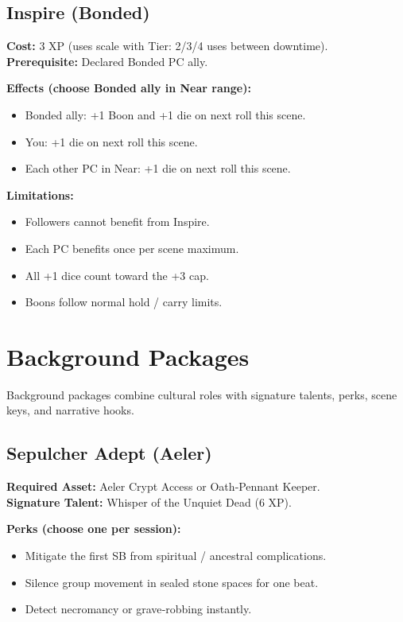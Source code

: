 \subsection{Inspire (Bonded)}\label{subsec:inspire_talent}

\textbf{Cost:} 3 XP (uses scale with Tier: 2/3/4 uses between downtime).\\
\textbf{Prerequisite:} Declared Bonded PC ally.

\textbf{Effects (choose Bonded ally in Near range):}
\begin{itemize}
    \item Bonded ally: +1 Boon and +1 die on next roll this scene.
    \item You: +1 die on next roll this scene.
    \item Each other PC in Near: +1 die on next roll this scene.
\end{itemize}

\textbf{Limitations:}
\begin{itemize}
    \item Followers cannot benefit from Inspire.
    \item Each PC benefits once per scene maximum.
    \item All +1 dice count toward the +3 cap.
    \item Boons follow normal hold / carry limits.
\end{itemize}

\section{Background Packages}\label{sec:background_packages}

Background packages combine cultural roles with signature talents, perks, scene keys, and narrative hooks.

\subsection{Sepulcher Adept (Aeler)}\label{subsec:sepulcher_adept}

\textbf{Required Asset:} Aeler Crypt Access or Oath‑Pennant Keeper.\\
\textbf{Signature Talent:} Whisper of the Unquiet Dead (6 XP).

\textbf{Perks (choose one per session):}
\begin{itemize}
    \item Mitigate the first SB from spiritual / ancestral complications.
    \item Silence group movement in sealed stone spaces for one beat.
    \item Detect necromancy or grave‑robbing instantly.
\end{itemize}

